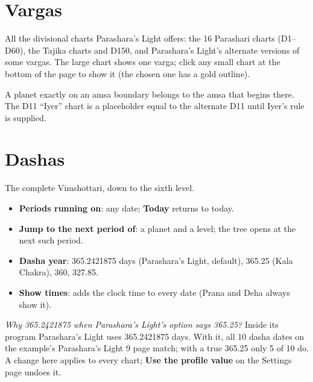 \documentclass[11pt, a4paper]{article}
\newcommand{\shot}[1]{}
\newcommand{\PL}{Parashara's Light}
\newcommand{\ui}[1]{\textbf{\textsf{#1}}}   %
\begin{document}
\section{Vargas}
\label{sec:vargas}
All the divisional charts \PL{} offers: the 16 Parashari charts (D1--D60), the Tajika charts and D150,
and \PL{}'s alternate versions of some vargas. The large chart shows one varga; click any small chart at
the bottom of the page to show it (the chosen one has a gold outline).

\shot{vamain}
\shot{vatable}

\begin{notebox}A planet exactly on an amsa boundary belongs to the amsa that begins there. The D11
``Iyer'' chart is a placeholder equal to the alternate D11 until Iyer's rule is supplied.\end{notebox}

\section{Dashas}
\label{sec:dashas}
The complete Vimshottari, down to the sixth level.

\shot{dacontrols}

\begin{itemize}[itemsep=2pt]
  \item \ui{Periods running on}: any date; \ui{Today} returns to today.
  \item \ui{Jump to the next period of}: a planet and a level; the tree opens at the next such period.
  \item \ui{Dasha year}: 365.2421875 days (\PL{}, default), 365.25 (Kala Chakra), 360, 327.85.
  \item \ui{Show times}: adds the clock time to every date (Prana and Deha always show it).
\end{itemize}

\shot{datree}
\shot{dapl}

\begin{qbox}\kq \emph{Why 365.2421875 when \PL{}'s option says 365.25?} Inside its program \PL{} uses
365.2421875 days. With it, all 10 dasha dates on the example's \PL{} 9 page match; with a true 365.25 only
5 of 10 do. A change here applies to every chart; \ui{Use the profile value} on the Settings page undoes it.
\end{qbox}
\end{document}
